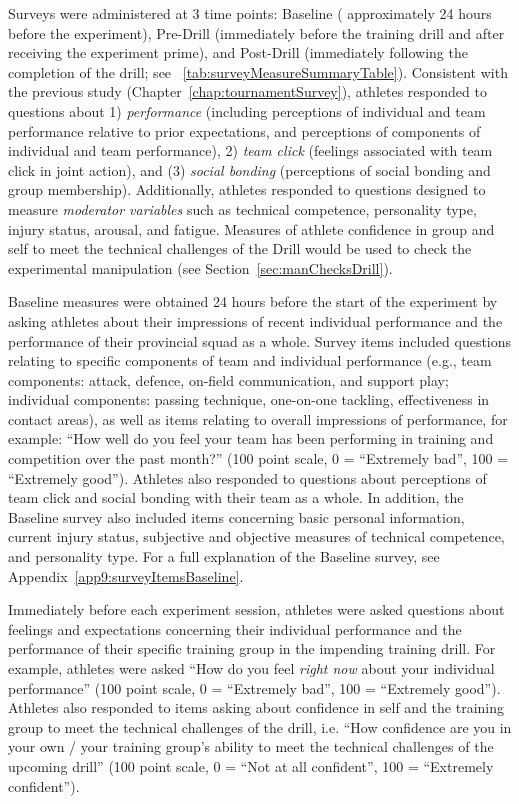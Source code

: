 \begin{CJK}{UTF8}{gbsn}
Surveys were administered at 3 time points: Baseline ( approximately 24 hours before the experiment), Pre-Drill (immediately before the training drill and after receiving the experiment prime), and Post-Drill (immediately following the completion of the drill; see ~\ref{tab:surveyMeasureSummaryTable}). Consistent with the previous study (Chapter~\ref{chap:tournamentSurvey}), athletes responded to questions about 1) \textit{performance} (including perceptions of individual and team performance relative to prior expectations, and perceptions of components of individual and team performance), 2) \textit{team click} (feelings associated with team click in joint action), and (3) \textit{social bonding} (perceptions of social bonding and group membership).  Additionally, athletes responded to questions designed to measure \textit{moderator variables} such as technical competence, personality type, injury status, arousal, and fatigue. Measures of athlete confidence in group and self to meet the technical challenges of the Drill would be used to check the experimental manipulation (see Section~\ref{sec:manChecksDrill}).


    


Baseline measures were obtained 24 hours before the start of the experiment by asking athletes about their impressions of recent individual performance and the performance of their provincial squad as a whole.  Survey items included questions relating to specific components of team and individual performance (e.g., team components: attack, defence, on-field communication, and support play; individual components: passing technique, one-on-one tackling, effectiveness in contact areas), as well as items relating to overall impressions of performance, for example: ``How well do you feel your team has been performing in training and competition over the past month?'' (100 point scale, 0 = ``Extremely bad'', 100 = ``Extremely good'').  Athletes also responded to questions about perceptions of team click and social bonding with their team as a whole.  In addition, the Baseline survey also included items concerning basic personal information, current injury status, subjective and objective measures of technical competence, and personality type.  For a full explanation of the Baseline survey, see Appendix~\ref{app9:surveyItemsBaseline}.


Immediately before each experiment session, athletes were asked questions about feelings and expectations concerning their individual performance and the performance of their specific training group in the impending training drill.  For example, athletes were asked ``How do you feel \textit{right now} about your individual performance'' (100 point scale, 0 = ``Extremely bad'', 100 = ``Extremely good'').  Athletes also responded to items asking about confidence in self and the training group to meet the technical challenges of the drill, i.e. ``How confidence are you in your own / your training group's ability to meet the technical challenges of the upcoming drill'' (100 point scale, 0 = ``Not at all confident'', 100 = ``Extremely confident'').


\end{CJK}
